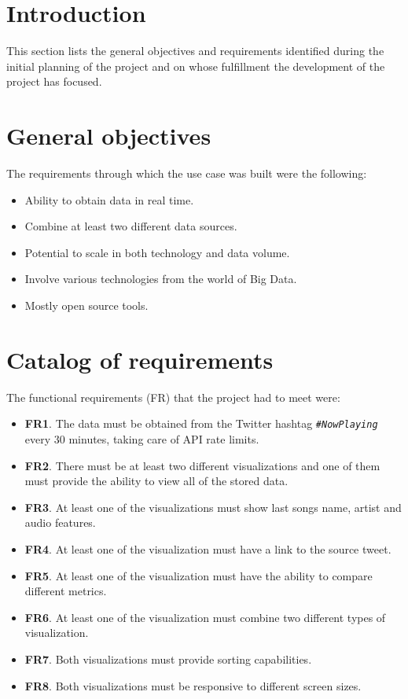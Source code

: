 
\section{Introduction}

\nonzeroparskip This section lists the general objectives and requirements identified during the initial planning of the project and on whose fulfillment the development of the project has focused.

\section{General objectives}

\nonzeroparskip The requirements through which the use case was built were the following:
\begin{itemize}
	\item Ability to obtain data in real time.
	\item Combine at least two different data sources.
	\item Potential to scale in both technology and data volume.
	\item Involve various technologies from the world of Big Data.
	\item Mostly open source tools.
\end{itemize}

\section{Catalog of requirements}

\nonzeroparskip The functional requirements (FR) that the project had to meet were:
\begin{itemize}
	\item \textbf{FR1}. The data must be obtained from the Twitter hashtag \texttt{\textit{\#NowPlaying}} every 30 minutes, taking care of API rate limits.
	\item \textbf{FR2}. There must be at least two different visualizations and one of them must provide the ability to view all of the stored data.
	\item \textbf{FR3}. At least one of the visualizations must show last songs name, artist and audio features.
	\item \textbf{FR4}. At least one of the visualization must have a link to the source tweet.
	\item \textbf{FR5}. At least one of the visualization must have the ability to compare different metrics.
	\item \textbf{FR6}. At least one of the visualization must combine two different types of visualization.
	\item \textbf{FR7}. Both visualizations must provide sorting capabilities.
	\item \textbf{FR8}. Both visualizations must be responsive to different screen sizes.
\end{itemize}

